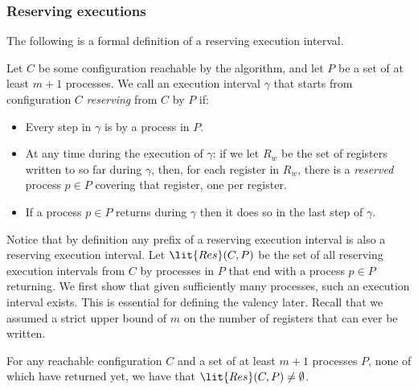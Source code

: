 \subsubsection{Reserving executions}
The following is a formal definition of a reserving execution interval.
\begin{definition}
Let $C$ be some configuration reachable by the algorithm, 
  and let $P$ be a set of at least $m+1$ processes.
We call an execution interval $\gamma$ that starts from configuration $C$ \emph{reserving} from $C$ by $P$ if:
\begin{itemize}[noitemsep, nolistsep]
\item Every step in $\gamma$ is by a process in $P$.  
\item At any time during the execution of $\gamma$:  
  if we let $R_w$ be the set of registers written to so far during $\gamma$, 
then, for each register in $R_w$, there is a \emph{reserved} process $p \in P$ covering that register, one per register. 
\item If a process $p \in P$ returns during $\gamma$ then it does so in the last step of $\gamma$. 
\end{itemize}
\end{definition}
Notice that by definition any prefix of a reserving execution interval is also a reserving execution interval. 
Let $\lit{Res}(C, P)$ be the set of all reserving execution intervals from $C$ by processes in $P$
  that end with a process $p \in P$ returning.
We first show that given sufficiently many processes, such an execution interval exists.
This is essential for defining the valency later.
Recall that we assumed a strict upper bound of $m$ on the number of registers that can ever be written.
\begin{claim}
For any reachable configuration $C$ and a set of at least $m+1$ processes $P$, none of which have returned yet, 
  we have that $\lit{Res}(C, P) \neq \emptyset$.
\label{clm:reserved}
\end{claim}
